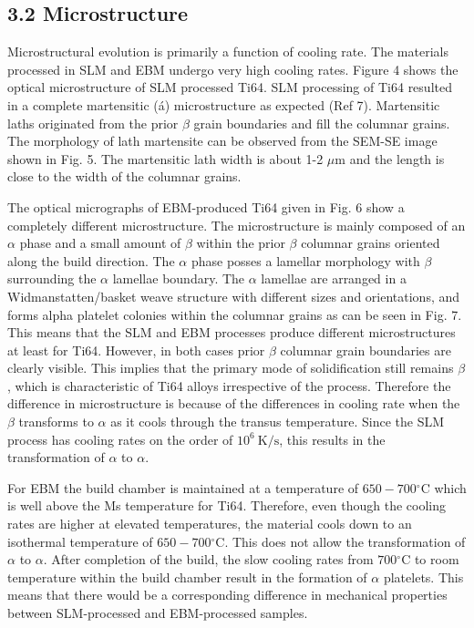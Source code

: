 \documentclass[10pt]{article}
\begin{document}
\subsection*{3.2 Microstructure}
Microstructural evolution is primarily a function of cooling rate. The materials processed in SLM and EBM undergo very high cooling rates. Figure 4 shows the optical microstructure of SLM processed Ti64. SLM processing of Ti64 resulted in a complete martensitic (á) microstructure as expected (Ref 7). Martensitic laths originated from the prior $\beta$ grain boundaries and fill the columnar grains. The morphology of lath martensite can be observed from the SEM-SE image shown in Fig. 5. The martensitic lath width is about 1-2 $\mu \mathrm{m}$ and the length is close to the width of the columnar grains.

The optical micrographs of EBM-produced Ti64 given in Fig. 6 show a completely different microstructure. The microstructure is mainly composed of an $\alpha$ phase and a small amount of $\beta$ within the prior $\beta$ columnar grains oriented along the build direction. The $\alpha$ phase posses a lamellar morphology with $\beta$ surrounding the $\alpha$ lamellae boundary. The $\alpha$ lamellae are arranged in a Widmanstatten/basket weave structure with different sizes and orientations, and forms alpha platelet colonies within the columnar grains as can be seen in Fig. 7. This means that the SLM and EBM processes produce different microstructures at least for Ti64. However, in both cases prior $\beta$ columnar grain boundaries are clearly visible. This implies that the primary mode of solidification still remains $\beta$, which is characteristic of Ti64 alloys irrespective of the process. Therefore the difference in microstructure is because of the differences in cooling rate when the $\beta$ transforms to $\alpha$ as it cools through the transus temperature. Since the SLM process has cooling rates on the order of $10^{6} \mathrm{~K} / \mathrm{s}$, this results in the transformation of $\alpha$ to $\alpha$.

For EBM the build chamber is maintained at a temperature of $650-700{ }^{\circ} \mathrm{C}$ which is well above the Ms temperature for Ti64. Therefore, even though the cooling rates are higher at elevated temperatures, the material cools down to an isothermal temperature of $650-700{ }^{\circ} \mathrm{C}$. This does not allow the transformation of $\alpha$ to $\alpha$. After completion of the build, the slow cooling rates from $700{ }^{\circ} \mathrm{C}$ to room temperature within the build chamber result in the formation of $\alpha$ platelets. This means that there would be a corresponding difference in mechanical properties between SLM-processed and EBM-processed samples.
\end{document}
